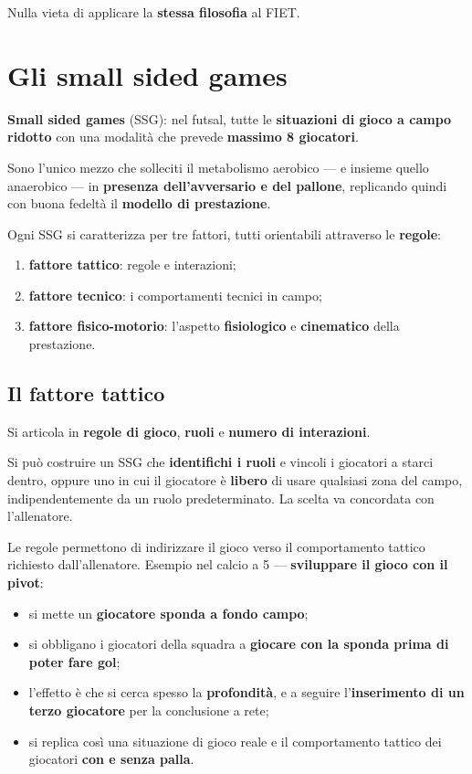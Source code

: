 Nulla vieta di applicare la \textbf{stessa filosofia} al FIET.

\section{Gli small sided games}
\label{sec:ssg}

\textbf{Small sided games} (SSG): nel futsal, tutte le \textbf{situazioni di gioco a campo ridotto}
con una modalità che prevede \textbf{massimo 8 giocatori}.

Sono l'unico mezzo che solleciti il metabolismo aerobico --- e insieme quello anaerobico --- in
\textbf{presenza dell'avversario e del pallone}, replicando quindi con buona fedeltà il
\textbf{modello di prestazione}.

Ogni SSG si caratterizza per tre fattori, tutti orientabili attraverso le \textbf{regole}:

\begin{enumerate}
  \item \textbf{fattore tattico}: regole e interazioni;
  \item \textbf{fattore tecnico}: i comportamenti tecnici in campo;
  \item \textbf{fattore fisico-motorio}: l'aspetto \textbf{fisiologico} e \textbf{cinematico} della
    prestazione.
\end{enumerate}

\subsection{Il fattore tattico}

Si articola in \textbf{regole di gioco}, \textbf{ruoli} e \textbf{numero di interazioni}.

Si può costruire un SSG che \textbf{identifichi i ruoli} e vincoli i giocatori a starci dentro,
oppure uno in cui il giocatore è \textbf{libero} di usare qualsiasi zona del campo,
indipendentemente da un ruolo predeterminato. La scelta va concordata con l'allenatore.

Le regole permettono di indirizzare il gioco verso il comportamento tattico richiesto
dall'allenatore. Esempio nel calcio a 5 --- \textbf{sviluppare il gioco con il pivot}:

\begin{itemize}
  \item si mette un \textbf{giocatore sponda a fondo campo};
  \item si obbligano i giocatori della squadra a \textbf{giocare con la sponda prima di poter fare
    gol};
  \item l'effetto è che si cerca spesso la \textbf{profondità}, e a seguire l'\textbf{inserimento di
    un terzo giocatore} per la conclusione a rete;
  \item si replica così una situazione di gioco reale e il comportamento tattico dei giocatori
    \textbf{con e senza palla}.
\end{itemize}

